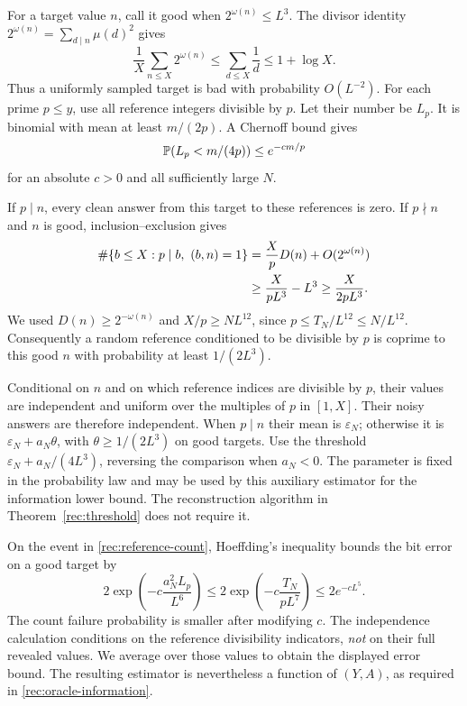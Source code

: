 For a target value $n$, call it good when $2^{\omega(n)}\le L^3$.
The divisor identity $2^{\omega(n)}=\sum_{d\mid n}\mu(d)^2$ gives
\[
 \frac1X\sum_{n\le X}2^{\omega(n)}
 \le\sum_{d\le X}\frac1d\le1+\log X.
\]
Thus a uniformly sampled target is bad with probability $O(L^{-2})$.
For each prime $p\le y$, use all reference integers divisible by $p$.
Let their number be $L_p$. It is binomial with mean at least $m/(2p)$.
A Chernoff bound gives
\begin{equation}\label{rec:reference-count}
 \mathbb P(L_p<m/(4p))\le e^{-cm/p}
\end{equation}
for an absolute $c>0$ and all sufficiently large $N$.

If $p\mid n$, every clean answer from this target to these references
is zero. If $p\nmid n$ and $n$ is good, inclusion--exclusion gives
\begin{align}
 \#\{b\le X:p\mid b,\ (b,n)=1\}
 &=\frac Xp D(n)+O(2^{\omega(n)})\notag\\
 &\ge\frac X{pL^3}-L^3
 \ge\frac X{2pL^3}.\label{rec:reference-separation}
\end{align}
We used $D(n)\ge2^{-\omega(n)}$ and
$X/p\ge N L^{12}$, since $p\le T_N/L^{12}\le N/L^{12}$.
Consequently a random reference conditioned to be divisible by $p$
is coprime to this good $n$ with probability at least $1/(2L^3)$.

Conditional on $n$ and on which reference indices are divisible by
$p$, their values are independent and uniform over the multiples of
$p$ in $[1,X]$. Their noisy answers are therefore independent. When
$p\mid n$ their mean is $\varepsilon_N$; otherwise it is
$\varepsilon_N+a_N\theta$, with $\theta\ge1/(2L^3)$ on good targets.
Use the threshold $\varepsilon_N+a_N/(4L^3)$, reversing the comparison
when $a_N<0$. The parameter is fixed in the probability law and may
be used by this auxiliary estimator for the information lower bound.
The reconstruction algorithm in Theorem~\ref{rec:threshold} does not
require it.

On the event in \eqref{rec:reference-count}, Hoeffding's inequality
bounds the bit error on a good target by
\begin{equation}\label{rec:reference-testing}
 2\exp\left(-c\frac{a_N^2L_p}{L^6}\right)
 \le2\exp\left(-c\frac{T_N}{pL^7}\right)
 \le2e^{-cL^5}.
\end{equation}
The count failure probability is smaller after modifying $c$.
The independence calculation conditions on the reference divisibility
indicators, \emph{not} on their full revealed values. We average over
those values to obtain the displayed error bound. The resulting
estimator is nevertheless a function of $(Y,A)$, as required in
\eqref{rec:oracle-information}.

